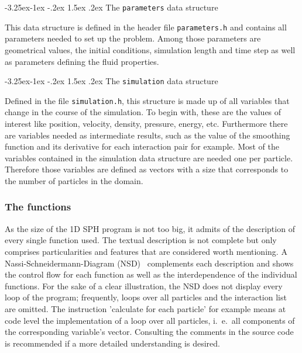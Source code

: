 \documentclass[11pt,a4paper,twoside]{report}
\makeatletter
\renewcommand\paragraph{\@startsection{paragraph}{4}{\z@}%
  {-3.25ex\@plus -1ex \@minus -.2ex}%
  {1.5ex \@plus .2ex}%
  {\normalfont\normalsize\bfseries}}
\makeatother
\begin{document}
\paragraph{The {\tt parameters} data structure}

This data structure is defined in the header file {\tt parameters.h} and 
contains all parameters needed to set up the problem. Among those parameters are 
geometrical values, the initial conditions, simulation length and time step 
as well as parameters defining the fluid properties.

\paragraph{The {\tt simulation} data structure}

Defined in the file {\tt simulation.h}, this structure is made up of all 
variables that change in the course of the simulation. To begin with, these are the values of interest like position, velocity, density, pressure, energy, etc. Furthermore there are variables needed as intermediate results, such as the value of the smoothing function and its derivative for each interaction pair for example. 
Most of the variables contained in the simulation data structure are needed one per particle. Therefore those variables are defined as vectors with a size that corresponds to the number of particles in the domain. 

\subsubsection{The functions}

As the size of the 1D SPH program is not too big, it admits of the description of every single function used. The textual description is not complete but only comprises particularities and features that are considered worth mentioning. A Nassi-Schneidermann-Diagram (NSD)~\cite{Nassi1973} complements each description and shows the control flow for each function as well as the interdependence of the individual functions. For the sake of a clear illustration, the NSD does not display every loop of the program; frequently, loops over all particles and the interaction list are omitted. The instruction 'calculate for each particle' for example means at code level the implementation of a loop over all particles, i.\ e.\, all components of the corresponding variable's vector.  Consulting the comments in the source code is recommended if a more detailed understanding is desired.
\end{document}
